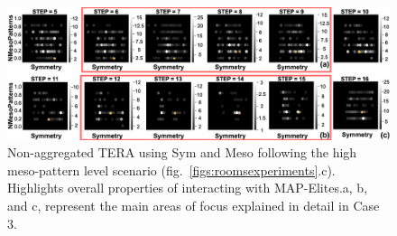 \begin{figure}[ht]
\centerline{\includegraphics[width=\textwidth]{figures/exp4-mesopat-explorDeadend_leavesearch/simple__X-sym-Y-mesoPat-simplify-combo-2.png}}
\caption{Non-aggregated TERA using Sym and Meso following the high meso-pattern level scenario (fig.~\ref{figs:roomsexperiments}.c). Highlights overall properties of interacting with MAP-Elites.a, b, and c, represent the main areas of focus explained in detail in Case 3.}
\label{figs:exp3}
\end{figure}








